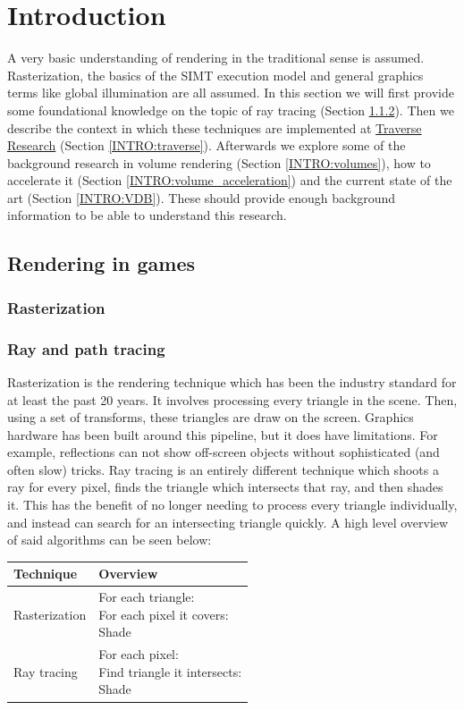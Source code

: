 \section{Introduction} \label{INTRO}
A very basic understanding of rendering in the traditional sense is assumed. Rasterization, the basics of the SIMT execution model and general graphics terms like global illumination are all assumed. In this section we will first provide some foundational knowledge on the topic of ray tracing (Section \ref{INTRO:tracing}). Then we describe the context in which these techniques are implemented at \href{https://traverseresearch.nl/}{Traverse Research} (Section \ref{INTRO:traverse}). Afterwards we explore some of the background research in volume rendering (Section \ref{INTRO:volumes}), how to accelerate it (Section \ref{INTRO:volume_acceleration}) and the current state of the art (Section \ref{INTRO:VDB}). These should provide enough background information to be able to understand this research.

\subsection{Rendering in games} \label{}
\subsubsection{Rasterization} 
\subsubsection{Ray and path tracing} \label{INTRO:tracing}
Rasterization is the rendering technique which has been the industry standard for at least the past 20 years. It involves processing every triangle in the scene. Then, using a set of transforms, these triangles are draw on the screen. Graphics hardware has been built around this pipeline, but it does have limitations. For example, reflections can not show off-screen objects without sophisticated (and often slow) tricks. Ray tracing is an entirely different technique which shoots a ray for every pixel, finds the triangle which intersects that ray, and then shades it. This has the benefit of no longer needing to process every triangle individually, and instead can search for an intersecting triangle quickly. A high level overview of said algorithms can be seen below:

\begin{tabular}{|l|l|}
    \hline
    Technique & Overview\\
    \hline
    Rasterization & \makecell[l]{For each triangle:\\ \quad For each pixel it covers:\\ \qquad Shade} \\
    \hline
    Ray tracing & \makecell[l]{For each pixel:\\\quad Find triangle it intersects:\\ \qquad Shade} \\
    \hline
\end{tabular}

